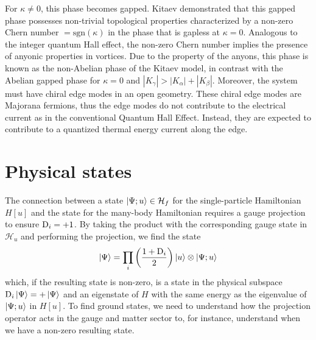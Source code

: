 For $\kappa \neq 0$, this phase becomes gapped. Kitaev demonstrated \cite{Kitaev2006} that this gapped phase possesses non-trivial topological properties characterized by a non-zero Chern number $=\text{sgn}(\kappa)$ in the phase that is gapless at $\kappa=0$. Analogous to the integer quantum Hall effect, the non-zero Chern number implies the presence of anyonic properties in vortices.
Due to the property of the anyons, this phase is known as the non-Abelian phase of the Kitaev model, in contrast with the Abelian gapped phase for $\kappa=0$ and $|K_\gamma|>|K_\alpha|+|K_\beta|$.
Moreover, the system must have chiral edge modes in an open geometry.
These chiral edge modes are Majorana fermions, thus the edge modes do not contribute to the electrical current as in the conventional Quantum Hall Effect. Instead, they are expected to contribute to a quantized thermal energy current along the edge.



\section{Physical states}

The connection between a state $\ket{\Psi ; u }\in \mathcal{H}_f$ for the single-particle Hamiltonian $H[u]$ and the state for the many-body Hamiltonian requires a gauge projection to ensure $\mathrm{D}_i=+1$. By taking the product with the corresponding gauge state in $\mathcal{H}_u$ and performing the projection, we find the state
\begin{equation}
    \ket{\Psi} =  \prod_{i }\left( \frac{1+\mathrm{D}_i}{2} \right) \ket{u}\otimes\ket{\Psi ; u }
\end{equation}
which, if the resulting state is non-zero,  is a state in the physical subspace $\mathrm{D}_i\ket{\Psi}=+\ket{\Psi}$ and an eigenstate of $H$ with the same energy as the eigenvalue of  $\ket{\Psi ; u }$ in $H[u]$. To find ground states, we need to understand how the projection operator acts in the gauge and matter sector to, for instance, understand when we have a non-zero resulting state.




